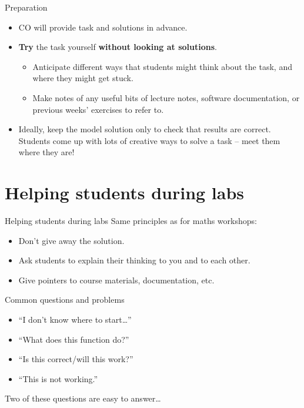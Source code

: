 \documentclass[10pt]{beamer}
\begin{document}
\begin{frame}[fragile]{Preparation}
    \begin{itemize}[<+->]
        \item CO will provide task and solutions in advance.
        \item \textbf{Try} the task yourself \textbf{without looking at solutions}.
            \begin{itemize}
                \item Anticipate different ways that students might think about the task, and where they might get stuck.
                \item Make notes of any useful bits of lecture notes, software documentation, or previous weeks' exercises to refer to.
            \end{itemize}
        \item Ideally, keep the model solution only to check that results are correct. Students come up with lots of creative ways to solve a task -- meet them where they are!
    \end{itemize}
\end{frame}

\section{Helping students during labs}

\begin{frame}{Helping students during labs}
    Same principles as for maths workshops:
    \begin{itemize}
        \item Don't give away the solution.
        \item Ask students to explain their thinking to you and to each other.
        \item Give pointers to course materials, documentation, etc.
    \end{itemize}
\end{frame}

\begin{frame}{Common questions and problems}
    \begin{itemize}
        \item ``I don't know where to start\ldots''
        \item ``What does this function do?'' 
        \item ``Is this correct/will this work?'' 
        \item ``This is not working.''
    \end{itemize}
    \pause
    Two of these questions are easy to answer\ldots
\end{frame}
\end{document}
